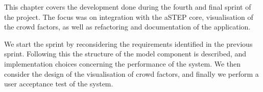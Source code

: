 This chapter covers the development done during the fourth and final sprint of the project. The focus was on integration with the aSTEP core, visualisation of the crowd factors, as well as refactoring and documentation of the application.

We start the sprint by reconsidering the requirements identified in the previous sprint. Following this the structure of the model component is described, and implementation choices concerning the performance of the system. We then consider the design of the visualisation of crowd factors, and finally we perform a user acceptance test of the system.